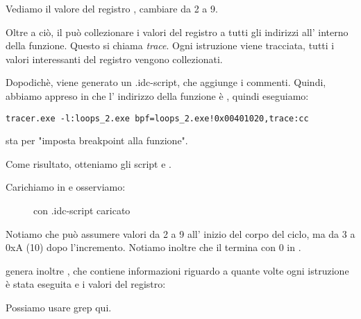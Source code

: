 Vediamo il valore del registro \ESI, cambiare da 2 a 9.

Oltre a ciò, il \tracer può collezionare i valori del registro a tutti gli indirizzi all' interno della funzione.
Questo si chiama \emph{trace}.
Ogni istruzione viene tracciata, tutti i valori interessanti del registro vengono collezionati.

Dopodichè, viene generato un \IDA .idc-script, che aggiunge i commenti.
Quindi, abbiamo appreso in \IDA che l' indirizzo della funzione \main è , quindi eseguiamo:

\begin{lstlisting}
tracer.exe -l:loops_2.exe bpf=loops_2.exe!0x00401020,trace:cc
\end{lstlisting}

 sta per "imposta breakpoint alla funzione".

Come risultato, otteniamo gli script  e .

\clearpage
Carichiamo  in \IDA e osserviamo:

\begin{figure}[H]
\centering
{}
\caption{\IDA con .idc-script caricato}
\label{fig:loops_IDA_tracer}
\end{figure}

Notiamo che \ESI può assumere valori da 2 a 9 all' inizio del corpo del ciclo,
ma da 3 a 0xA (10) dopo l'incremento.
Notiamo inoltre che il \main termina con 0 in \EAX.

\tracer genera inoltre , 
che contiene informazioni riguardo a quante volte ogni istruzione è stata eseguita e i valori del registro:


\myindex{\GrepUsage}
Possiamo usare grep qui.

